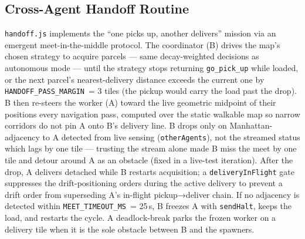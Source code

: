 \subsection{Cross-Agent Handoff Routine}
\texttt{handoff.js} implements the ``one picks up, another delivers'' mission via an emergent meet-in-the-middle protocol. The coordinator (B) drives the map's chosen strategy to acquire parcels — same decay-weighted decisions as autonomous mode — until the strategy stops returning \texttt{go\_pick\_up} while loaded, or the next parcel's nearest-delivery distance exceeds the current one by \texttt{HANDOFF\_PASS\_MARGIN}~= 3 tiles (the pickup would carry the load past the drop). B then re-steers the worker (A) toward the live geometric midpoint of their positions every navigation pass, computed over the static walkable map so narrow corridors do not pin A onto B's delivery line. B drops only on Manhattan-adjacency to A detected from live sensing (\texttt{otherAgents}), not the streamed status which lags by one tile — trusting the stream alone made B miss the meet by one tile and detour around A as an obstacle (fixed in a live-test iteration). After the drop, A delivers detached while B restarts acquisition; a \texttt{deliveryInFlight} gate suppresses the drift-positioning orders during the active delivery to prevent a drift order from superseding A's in-flight pickup→deliver chain. If no adjacency is detected within \texttt{MEET\_TIMEOUT\_MS}~= 25\,s, B freezes A with \texttt{sendHalt}, keeps the load, and restarts the cycle. A deadlock-break parks the frozen worker on a delivery tile when it is the sole obstacle between B and the spawners.
